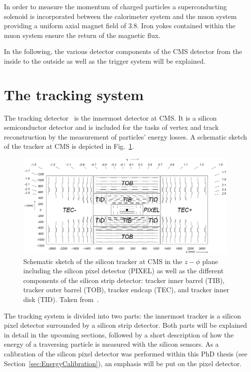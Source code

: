 In order to measure the momentum of charged particles a superconducting solenoid is incorporated between the calorimeter system and the muon system providing a uniform axial magnet field of 3.8\tesla.
Iron yokes contained within the muon system ensure the return of the magnetic flux. 

In the following, the various detector components of the CMS detector from the inside to the outside as well as the trigger system will be explained.
\FloatBarrier
\section{The tracking system}
The tracking detector~\cite{bib:CMS:TDR_2006,bib:CMS:Tracker_1997,bib:CMS:Tracker_2000} is the innermost detector at CMS. 
It is a silicon semiconductor detector and is included for the tasks of vertex and track reconstruction by the measurement of particles' energy losses.
A schematic sketch of the tracker at CMS is depicted in Fig.~\ref{fig:Tracker}.
\begin{figure}[!b]
  \centering
      \includegraphics[width=0.99\textwidth]{figures/experiment/CMS/Figures_Experimental_Apparatus_Tracker.png}
  \caption{Schematic sketch of the silicon tracker at CMS in the $z - \phi$ plane including the silicon pixel detector (PIXEL) as well as the different components of the silicon strip detector: tracker inner barrel (TIB), tracker outer barrel (TOB), tracker endcap (TEC), and tracker inner disk (TID). Taken from~\cite{bib:CMS:tracking_8TeV}.
           }  
  \label{fig:Tracker}
\end{figure}
The tracking system is divided into two parts: the innermost tracker is a silicon pixel detector surrounded by a silicon strip detector.
Both parts will be explained in detail in the upcoming sections, followed by a short description of how the energy of a traversing particle is measured with the silicon sensors.
As a calibration of the silicon pixel detector was performed within this PhD thesis (see Section~\ref{sec:EnergyCalibration}), an emphasis will be put on the pixel detector.


